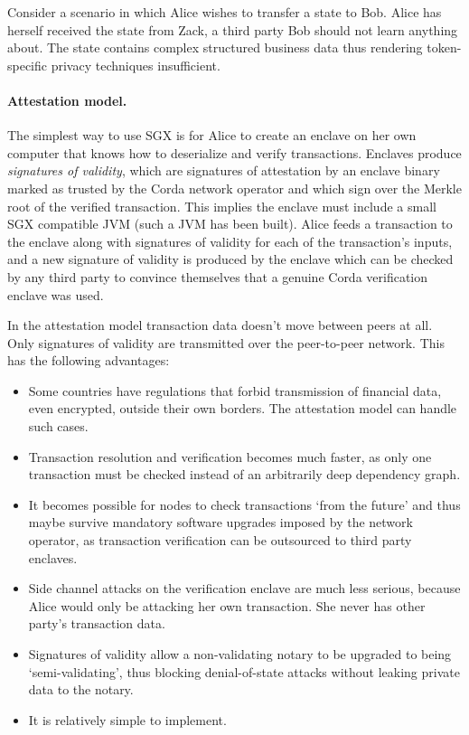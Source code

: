 \documentclass{article}
\begin{document}
Consider a scenario in which Alice wishes to transfer a state to Bob. Alice has herself received the state from
Zack, a third party Bob should not learn anything about. The state contains complex structured business data thus
rendering token-specific privacy techniques insufficient.

\paragraph{Attestation model.}The simplest way to use SGX is for Alice to create an enclave on her own computer that
knows how to deserialize and verify transactions. Enclaves produce \emph{signatures of validity}, which are
signatures of attestation by an enclave binary marked as trusted by the Corda network operator and which sign over
the Merkle root of the verified transaction. This implies the enclave must include a small SGX compatible JVM (such
a JVM has been built). Alice feeds a transaction to the enclave along with signatures of validity for each of the
transaction's inputs, and a new signature of validity is produced by the enclave which can be checked by
any third party to convince themselves that a genuine Corda verification enclave was used.

In the attestation model transaction data doesn't move between peers at all. Only signatures of validity are
transmitted over the peer-to-peer network. This has the following advantages:

\begin{itemize}
    \item Some countries have regulations that forbid transmission of financial data, even encrypted, outside their
          own borders. The attestation model can handle such cases.
    \item Transaction resolution and verification becomes much faster, as only one transaction must be checked
          instead of an arbitrarily deep dependency graph.
    \item It becomes possible for nodes to check transactions `from the future' and thus maybe survive mandatory
          software upgrades imposed by the network operator, as transaction verification can be outsourced to
          third party enclaves.
    \item Side channel attacks on the verification enclave are much less serious, because Alice would only be
          attacking her own transaction. She never has other party's transaction data.
    \item Signatures of validity allow a non-validating notary to be upgraded to being `semi-validating', thus
          blocking denial-of-state attacks without leaking private data to the notary.
    \item It is relatively simple to implement.
\end{itemize}
\end{document}
